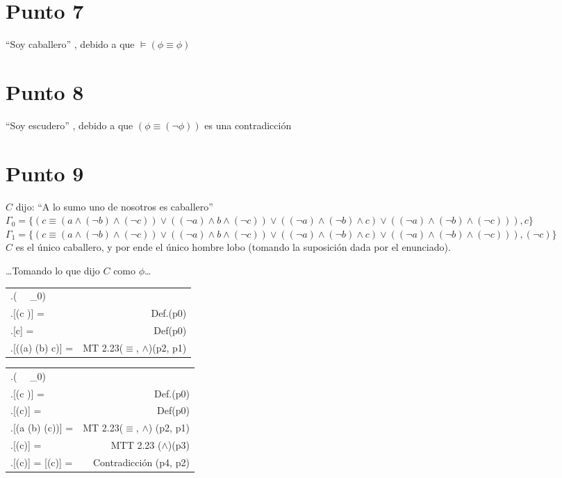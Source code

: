 \documentclass{article}
\newcommand{\q}[1]{``#1''}
\newcommand{\val}[2]{\mathbf{#1}[#2]}
\newlength{\logicv}
\newenvironment{logicenv}[2][0]{
  \begin{tcolorbox}[demo, title = #2]
  \vspace*{#1\logicv}
}{
  \end{tcolorbox}
  \vspace*{-.5cm}
}
\newenvironment{subproofill}[1][0]{
  \begin{tcolorbox}[demo, title = ]
    \vspace*{-#1\logicv}
}{
  \end{tcolorbox}
  \vspace*{-.5cm}
}
\newenvironment{subproof}[2][0]{
  \begin{tcolorbox}[demo, title = #2, colframe = black]
  \vspace*{#1\logicv}
  \begin{logic}
}{
  \end{logic}
  \end{tcolorbox}
}
\newenvironment{logic}{
    \setlength{\extrarowheight}{3pt}
    \setcounter{row}{-1}
    \begin{center}
    \begin{NiceTabular}{>{\stepcounter{row}\therow.\hspace*{5pt}} L r }
}{
    \end{NiceTabular}
    \end{center}
}
\begin{document}
\section{Punto 7}

\q{Soy caballero} , debido a que $\vDash (\phi \equiv \phi)$

\section{Punto 8}

\q{Soy escudero} , debido a que $(\phi \equiv (\neg \phi))$ es una contradicción

\section{Punto 9}

\begin{logicenv}[5]{Punto 23}
  $C$ dijo: \q{A lo sumo uno de nosotros es caballero}\\
  $\Gamma_0 = \{(c \equiv (a \land (\neg b) \land (\neg c)) \lor ((\neg a) \land b \land (\neg c)) \lor ((\neg a) \land (\neg b) \land c) \lor ((\neg a) \land (\neg b) \land (\neg c))), c\}$\\
  $\Gamma_1 = \{(c \equiv (a \land (\neg b) \land (\neg c)) \lor ((\neg a) \land b \land (\neg c)) \lor ((\neg a) \land (\neg b) \land c) \lor ((\neg a) \land (\neg b) \land (\neg c))), (\neg c)\}$
  \makebox[16.5cm]{\hrulefill}\\
  $C$ es el único caballero, y por ende el único hombre lobo (tomando la suposición dada por el enunciado).
\end{logicenv}
\begin{subproofill}
  \dots Tomando lo que dijo $C$ como $\phi$\dots
  \begin{subproof}[5]{Con $\Gamma_0$}
    (\exists {} \, \vert\,   \Gamma_0)\\
    \val{v}{(c \equiv \phi)} =  & Def.(p0)\\
    \val{v}{c} =  & Def(p0)\\
    \val{v}{((\neg a) \land (\neg b) \land c)} =  & MT 2.23($\equiv$, $\land$)(p2, p1)\\
  \end{subproof}
\end{subproofill}
\begin{subproofill}
  \begin{subproof}[5]{Con $\Gamma_1$}
    (\exists {} \, \vert\,   \Gamma_0)\\
    \val{v}{(c \equiv \phi)} =  & Def.(p0)\\
    \val{v}{(\neg c)} =  & Def(p0)\\
    \val{v}{(a \land (\neg b) \land (\neg c))} =  & MT 2.23($\equiv$, $\land$) (p2, p1)\\
    \val{v}{(\neg c)} =  & MTT 2.23 ($\land$)(p3)\\ 
    \val{v}{(\neg c)} =   \val{v}{(\neg c)} =  & Contradicción (p4, p2)
  \end{subproof} 
\end{subproofill}
\end{document}
